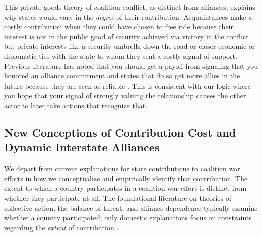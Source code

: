 \documentclass[12pt,letterpaper]{article}
\begin{document}
	This private goods theory of coalition conflict, as distinct from alliances, explains why states would vary in the \textit{degree} of their contribution. Acquaintances make a costly contribution when they could have chosen to free ride because their interest is not in the public good of security achieved via victory in the conflict but private interests like a security umbrella down the road or closer economic or diplomatic ties with the state to whom they sent a costly signal of support. Previous literature has noted that you should get a payoff from signaling that you honored an alliance commitment and states that do so get more allies in the future because they are seen as reliable \citep[427-428]{gibler_costsrenegingreputation_2008}. This is consistent with our logic where you hope that your signal of strongly valuing the relationship causes the other actor to later take actions that recognize that.
	
	\subsection{New Conceptions of Contribution Cost and Dynamic Interstate Alliances}
		We depart from current explanations for state contributions to coalition war efforts in how we conceptualize and empirically identify that contribution. The extent to which a country participates in a coalition war effort is distinct from whether they participate at all. The foundational literature on theories of collective action, the balance of threat, and alliance dependence typically examine whether a country participated; only domestic explanations focus on constraints regarding the \textit{extent} of contribution \citep{bennett_burdensharingpersiangulf_1994, bogers_missionafghanistanwho_2013}.
\end{document}
